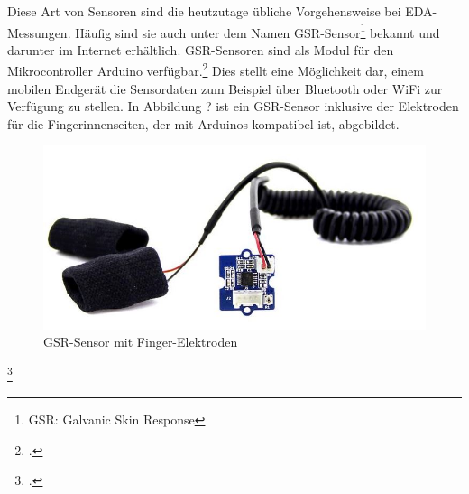 Diese Art von Sensoren sind die heutzutage übliche Vorgehensweise bei EDA-Messungen. Häufig sind sie auch unter dem Namen GSR-Sensor\footnote{GSR: Galvanic Skin Response} bekannt und darunter im Internet erhältlich. GSR-Sensoren sind als Modul für den Mikrocontroller Arduino verfügbar.\footcite[beispielsweise:][]{Gro18} Dies stellt eine Möglichkeit dar, einem mobilen Endgerät die Sensordaten zum Beispiel über Bluetooth oder WiFi zur Verfügung zu stellen. In Abbildung ? ist ein GSR-Sensor inklusive der Elektroden für die Fingerinnenseiten, der mit Arduinos kompatibel ist, abgebildet.
\begin{figure}[h]
	\centering
	\includegraphics[width=15cm]{Bilder/sensor.jpg}
	\caption[GSR-Sensor mit Finger-Elektroden]{GSR-Sensor mit Finger-Elektroden\footnotemark}
\end{figure}%
\footcitetext{Gro18}
